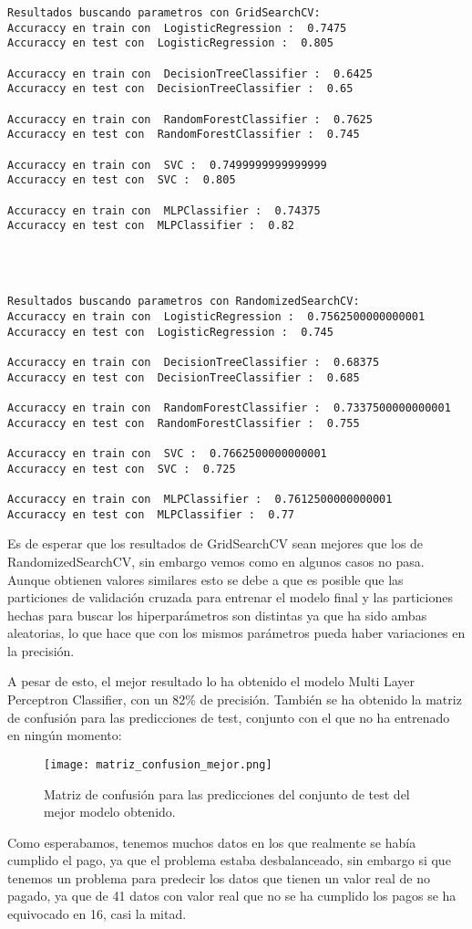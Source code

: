 \begin{lstlisting}
Resultados buscando parametros con GridSearchCV:
Accuraccy en train con  LogisticRegression :  0.7475
Accuraccy en test con  LogisticRegression :  0.805

Accuraccy en train con  DecisionTreeClassifier :  0.6425
Accuraccy en test con  DecisionTreeClassifier :  0.65

Accuraccy en train con  RandomForestClassifier :  0.7625
Accuraccy en test con  RandomForestClassifier :  0.745

Accuraccy en train con  SVC :  0.7499999999999999
Accuraccy en test con  SVC :  0.805

Accuraccy en train con  MLPClassifier :  0.74375
Accuraccy en test con  MLPClassifier :  0.82




Resultados buscando parametros con RandomizedSearchCV:
Accuraccy en train con  LogisticRegression :  0.7562500000000001
Accuraccy en test con  LogisticRegression :  0.745

Accuraccy en train con  DecisionTreeClassifier :  0.68375
Accuraccy en test con  DecisionTreeClassifier :  0.685

Accuraccy en train con  RandomForestClassifier :  0.7337500000000001
Accuraccy en test con  RandomForestClassifier :  0.755

Accuraccy en train con  SVC :  0.7662500000000001
Accuraccy en test con  SVC :  0.725

Accuraccy en train con  MLPClassifier :  0.7612500000000001
Accuraccy en test con  MLPClassifier :  0.77
\end{lstlisting}


Es de esperar que los resultados de GridSearchCV sean mejores que los de RandomizedSearchCV, sin embargo vemos como en algunos casos no pasa. Aunque obtienen valores similares esto se debe a que es posible que las particiones de validación cruzada para entrenar el modelo final y las particiones hechas para buscar los hiperparámetros son distintas ya que ha sido ambas aleatorias, lo que hace que con los mismos parámetros pueda haber variaciones en la precisión.

A pesar de esto, el mejor resultado lo ha obtenido el modelo Multi Layer Perceptron Classifier, con un 82\% de precisión. También se ha obtenido la matriz de confusión para las predicciones de test, conjunto con el que no ha entrenado en ningún momento:

\begin{figure}[H]
	\centering
	\texttt{[image: matriz\_confusion\_mejor.png]}
	\caption{Matriz de confusión para las predicciones del conjunto de test del mejor modelo obtenido.}
	\label{fig:matriz_confusion_mejor}
\end{figure}

Como esperabamos, tenemos muchos datos en los que realmente se había cumplido el pago, ya que el problema estaba desbalanceado, sin embargo si que tenemos un problema para predecir los datos que tienen un valor real de no pagado, ya que de 41 datos con valor real que no se ha cumplido los pagos se ha equivocado en 16, casi la mitad.
